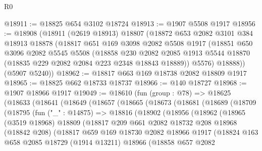 \begin{lexlean}{R0}
\begin{coremodule}
@18911 := @18825 @654 @3102 @18724
@18913 := @1907 @5508 @1917
@18956 := @18908
    (@18911
      (@2619 @18913)
      @18807
      (@18872
        @653
        @2082
        @3101
        @384
        @18913
        @18878
        (@18817
          @651
          @169
          @3098
          @2082
          @5508
          @1917
          (@18851
            @650
            @3096
            @2082
            @5545
            @5508
            (@18858
              @230
              @2082
              @2085
              @1913
              @5544
              @18870
              (@18835 @229 @2082 @2084 @223 @2348 @18843 @18889))
            @5576)
          @18888))
      (@5907 @5240))
@18962 := @18817 @663 @169 @18738 @2082 @18809 @1917
@18965 := @18825 @662 @18733 @18737
@18966 := @140 @18727
@18968 := @1907 @18966 @1917
@19049 := @18610
    (fun (group : @78) =>
    @18625
      (@18633
        (@18641
          (@18649
            (@18657
              (@18665
                (@18673
                  (@18681
                    (@18689
                      (@18709
                        (@18795
                          (fun ("_" : @14875) =>
                          @18816
                            (@18902
                              (@18956
                                (@18962
                                  (@18965
                                    (@3519 @18968)
                                    @18809
                                    (@18817
                                      @209
                                      @661
                                      @2082
                                      @18732
                                      @208
                                      @18968
                                      (@18842 @208)
                                      (@18817
                                        @659
                                        @169
                                        @18730
                                        @2082
                                        @18966
                                        @1917
                                        (@18824
                                          @163
                                          @658
                                          @2085
                                          @18729
                                          (@1914 @13211)
                                          @18966
                                          (@18858
                                            @657
                                            @2082

\end{coremodule}
\end{lexlean}
